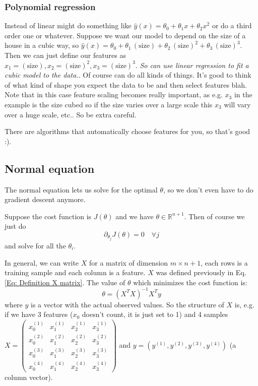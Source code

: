 \documentclass[a4paper, 10pt,hidelinks]{article}
\newcommand{\R}{\mathbb{R}}
\begin{document}
\subsubsection{Polynomial regression} 
Instead of linear might do something like $\hat{y}(x) = \theta_0 + \theta_1 x  + \theta_2 x^2$ or do a third order one or whatever. Suppose we want our model to depend on the size of a house in a cubic way, so $\hat{y}(x) = \theta_0 + \theta_1 \, (\text{size})  + \theta_2 \, (\text{size})^2  + \theta_3 \, (\text{size})^3$. Then we can just define our features as $x_1 = (\text{size}), x_2 = (\text{size})^2, x_3 = (\text{size})^3$. \emph{So can use linear regression to fit a cubic model to the data.}. Of course can do all kinds of things. It's good to think of what kind of shape you expect the data to be and then select features blah. Note that in this case feature scaling becomes really important, as e.g. $x_3$ in the example is the size cubed so if the size varies over a large scale this $x_3$ will vary over a huge scale, etc.. So be extra careful.

There are algorithms that automatically choose features for you, so that's good :). 


\subsection{Normal equation}
The normal equation lets us solve for the optimal $\theta$, so we don't even have to do gradient descent anymore.

Suppose the cost function is $J(\theta)$ and we have $\theta \in \R^{n + 1}$. Then of course we just do 
\begin{equation}
\partial_{\theta_j} J(\theta) = 0 \quad \forall j
\end{equation}
and solve for all the $\theta_i$. 

In general, we can write $X$ for a matrix of dimension $m \times n+1$, each rows is a training sample and each column is a feature. $X$ was defined previously in Eq. \eqref{Eq: Definition X matrix}. The value of $\theta$ which minimizes the cost function is:
\begin{equation}
\theta  = (X^T X)^{-1} X^T y
\end{equation}
where $y$ is a vector with the actual observed values. So the structure of $X$ is, e.g. if we have 3 features ($x_0$ doesn't count, it is just set to 1) and 4 samples
$X = 
\begin{pmatrix}
x^{(1)}_0 & x^{(1)}_1 & x^{(1)}_2 & x^{(1)}_3 \\
x^{(2)}_0 & x^{(2)}_1 & x^{(2)}_2 & x^{(2)}_3 \\
x^{(3)}_0 & x^{(3)}_1 & x^{(3)}_2 & x^{(3)}_3 \\
x^{(4)}_0 & x^{(4)}_1 & x^{(4)}_2 & x^{(4)}_3
\end{pmatrix}$
and $y = (y^{(1)}, y^{(2)}, y^{(3)}, y^{(4)})$ (a column vector). 
\end{document}
